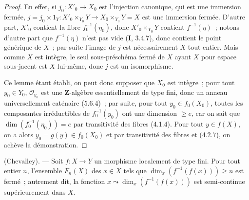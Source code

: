 \begin{proof}
En effet, si $j_0:X'_0\to X_0$ est l'injection canonique, qui est une immersion
fermée, $j=j_0\times 1_Y:X'_0\times_{Y_0}Y\to X_0\times_{Y_0}Y=X$ est une
immersion fermée. D'autre part, $X'_0$ contient la fibre
$f_0^{-1}(\eta_0)$, donc $X'_0\times_{Y_0}Y$ contient $f^{-1}(\eta)$~;
notons d'autre part que $f^{-1}(\eta)$ n'est pas vide (\textbf{I}, 3.4.7),
donc contient le point générique de $X$~; par suite l'image de $j$ est
nécessairement $X$ tout entier. Mais comme $X$ est intègre, le seul
sous-préschéma fermé de $X$ ayant $X$ pour espace sous-jacent est $X$
lui-même, donc $j$ est un isomorphisme.

Ce lemme étant établi, on peut donc supposer que $X_0$ est intègre~; pour tout
$y_0\in Y_0$, $\mathcal O_{y_0}$ est une $\mathbf Z$-algèbre essentiellement
de type fini, donc un anneau universellement
caténaire (5.6.4)~; par suite, pour tout $y_0\in f_0(X_0)$, toutes les
composantes irréductibles de $f_0^{-1}(y_0)$ ont une dimension $\geq e$, car on
sait que $\dim(f_0^{-1}(\eta_0))=e$ par transitivité des fibres (4.1.4). Pour
tout $y\in f(X)$, on a alors $y_0=g(y)\in f_0(X_0)$ et par transitivité des
fibres et (4.2.7), on achève la démonstration.
\end{proof}

\begin{theorem}[13.1.3]
\label{IV.13.1.3-fr}
\textnormal{(Chevalley).} --- Soit $f:X\to Y$ un morphisme localement de type
fini. Pour tout entier $n$, l'ensemble $F_n(X)$ des $x\in X$ tels que
$\dim_x(f^{-1}(f(x)))\geq n$ est fermé~; autrement dit, la fonction
$x\leadsto\dim_x(f^{-1}(f(x)))$ est semi-continue supérieurement dans $X$.
\end{theorem}

